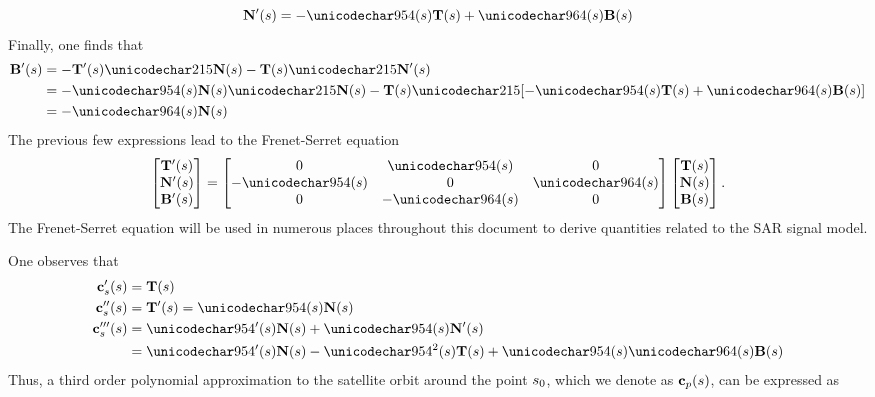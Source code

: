 \begin{equation}
 \vct{N}'(\parm) = -\kappa(\parm)\vct{T}(\parm)+\tau(\parm)\vct{B}(\parm)
\end{equation}
Finally, one finds that
\begin{equation}
\begin{split}
 \vct{B}'(\parm) &= -\vct{T}'(\parm)\times\vct{N}(\parm) - \vct{T}(\parm)\times\vct{N}'(\parm)\\
 &=-\kappa(\parm)\vct{N}(\parm)\times\vct{N}(\parm) - \vct{T}(\parm)\times[-\kappa(\parm)\vct{T}(\parm)+\tau(\parm)\vct{B}(\parm)]\\
 &=-\tau(\parm)\vct{N}(\parm)
 \end{split}
\end{equation}
The previous few expressions lead to the Frenet-Serret equation
\begin{equation}
 \begin{bmatrix}\vct{T}'(\parm)\\\vct{N}'(\parm)\\\vct{B}'(\parm)\end{bmatrix}
 =
 \begin{bmatrix}
  0 &\kappa(\parm)& 0\\
  -\kappa(\parm)& 0 &\tau(\parm)\\
  0 &-\tau(\parm)& 0
 \end{bmatrix}
 \begin{bmatrix}\vct{T}(\parm)\\\vct{N}(\parm)\\\vct{B}(\parm)\end{bmatrix}.
 \label{eq:FrenetSerret}
\end{equation}
The Frenet-Serret equation will be used in numerous places throughout this document to derive quantities related to the SAR signal model.
\par
One observes that
\begin{equation}
\begin{split}
 \sats'(\parm) &= \vct{T}(\parm)\\
 \sats''(\parm) &= \vct{T}'(\parm) = \kappa(\parm)\vct{N}(\parm)\\
 \sats'''(\parm) &= \kappa'(\parm)\vct{N}(\parm) + \kappa(\parm)\vct{N}'(\parm)\\
 &= \kappa'(\parm)\vct{N}(\parm) -\kappa^2(\parm)\vct{T}(\parm)+\kappa(\parm)\tau(\parm)\vct{B}(\parm)
\end{split}
\end{equation}
Thus, a third order polynomial approximation to the satellite orbit around the point $s_0$, which we denote as $\mathbf{c}_p(s)$, can be expressed as
